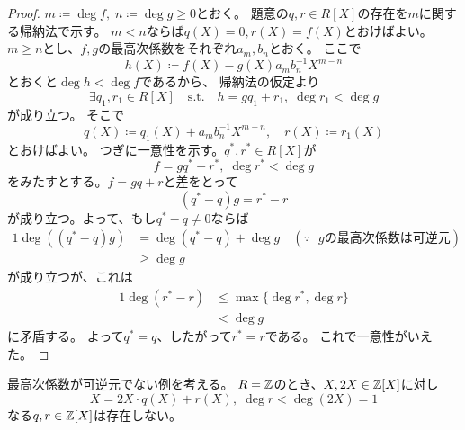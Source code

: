 \documentclass[report]{jlreq}
\begin{document}
\begin{proof}
    $m \coloneqq \deg f,\; n \coloneqq \deg g \ge 0$とおく。
    題意の$q, r \in R[X]$の存在を$m$に関する帰納法で示す。
    $m < n$ならば$q(X) = 0, r(X) = f(X)$とおけばよい。
    $m \ge n$とし、$f, g$の最高次係数をそれぞれ$a_m, b_n$とおく。
    ここで
    \begin{equation}
        h(X) \coloneqq f(X) - g(X) a_m b_n^{-1} X^{m - n}
    \end{equation}
    とおくと$\deg h < \deg f$であるから、
    帰納法の仮定より
    \begin{equation}
        \exists q_1, r_1 \in R[X]
        \quad \text{s.t.} \quad
        h = gq_1 + r_1,
        \; \deg r_1 < \deg g
    \end{equation}
    が成り立つ。
    そこで
    \begin{equation}
        q(X) \coloneqq q_1(X) + a_m b_n^{-1} X^{m - n},
        \quad
        r(X) \coloneqq r_1(X)
    \end{equation}
    とおけばよい。
    つぎに一意性を示す。$q^*, r^* \in R[X]$が
    \begin{equation}
        f = g q^* + r^*,
        \; \deg r^* < \deg g
    \end{equation}
    をみたすとする。$f = gq + r$と差をとって
    \begin{equation}
        (q^* - q) g = r^* - r
    \end{equation}
    が成り立つ。よって、もし$q^* - q \neq 0$ならば
    \begin{alignat}{1}
        \deg ((q^* - q) g)
            &= \deg (q^* - q) + \deg g \quad (\because \text{ $g$の最高次係数は可逆元}) \\
            &\ge \deg g
    \end{alignat}
    が成り立つが、これは
    \begin{alignat}{1}
        \deg (r^* - r)
            &\le \max \{ \deg r^*, \deg r \} \\
            &< \deg g
    \end{alignat}
    に矛盾する。
    よって$q^* = q$、したがって$r^* = r$である。
    これで一意性がいえた。
\end{proof}

\begin{remark}[除法定理が成り立たない例]
    最高次係数が可逆元でない例を考える。
    $R = \mathbb{Z}$のとき、$X, 2X \in \mathbb{Z}[X]$に対し
    \begin{equation}
        X = 2X \cdot q(X) + r(X),\;
        \deg r < \deg (2X) = 1
    \end{equation}
    なる$q, r \in \mathbb{Z}[X]$は存在しない。
\end{remark}
\end{document}
